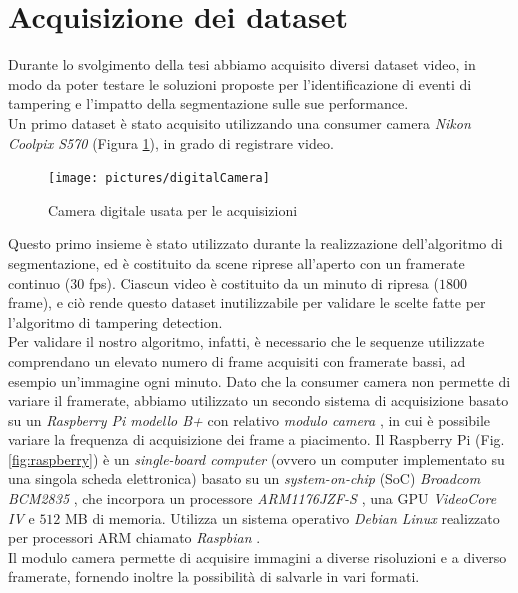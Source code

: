 \section{Acquisizione dei dataset}
\label{acquisizione}
Durante lo svolgimento della tesi abbiamo acquisito diversi dataset video, in modo da poter testare le soluzioni proposte per l'identificazione di eventi di tampering e l'impatto della segmentazione sulle sue performance.\\
Un primo dataset \`e stato acquisito utilizzando una consumer camera \textit{Nikon Coolpix S570} \cite{nikon} (Figura \ref{fig:digitalCamera}), in grado di registrare video.
\begin{figure}
\centering
\texttt{[image: pictures/digitalCamera]}
\caption[Camera digitale usata per le acquisizioni]{Camera digitale usata per le acquisizioni}
\label{fig:digitalCamera}
\end{figure}
Questo primo insieme \`e stato utilizzato durante la realizzazione dell'algoritmo di segmentazione, ed \`e costituito da scene riprese all'aperto con un framerate continuo ($30$ fps).
Ciascun video \`e costituito da un minuto di ripresa ($1800$ frame), e ci\`o rende questo dataset inutilizzabile per validare le scelte fatte per l'algoritmo di tampering detection.\\
Per validare il nostro algoritmo, infatti, \`e necessario che le sequenze utilizzate comprendano un elevato numero di frame acquisiti con framerate bassi, ad esempio un'immagine ogni minuto. 
Dato che la consumer camera non permette di variare il framerate, abbiamo utilizzato un secondo sistema di acquisizione basato su un \textit{Raspberry Pi modello B+} \cite{raspberry} con relativo \textit{modulo camera} \cite{raspberryCamera}, in cui \`e possibile variare la frequenza di acquisizione dei frame a piacimento.
Il Raspberry Pi (Fig. \ref{fig:raspberry}) \`e un \textit{single-board computer} (ovvero un computer implementato su una singola scheda elettronica) basato su un \textit{system-on-chip} (SoC) \textit{Broadcom BCM2835} \cite{broadcom}, che incorpora un processore \textit{ARM1176JZF-S} \cite{arm}, una GPU \textit{VideoCore IV} \cite{gpu} e $512$ MB di memoria.
Utilizza un sistema operativo \textit{Debian Linux} realizzato per processori ARM chiamato \textit{Raspbian} \cite{raspbian}.\\
Il modulo camera permette di acquisire immagini a diverse risoluzioni e a diverso framerate, fornendo inoltre la possibilit\`a di salvarle in vari formati.\\
